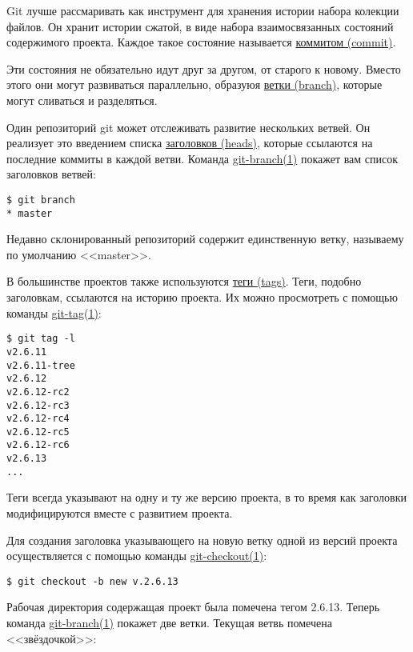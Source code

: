 \documentclass[a4paper, 11pt]{report}
\begin{document}
Git лучше рассмаривать как инструмент для хранения истории набора колекции файлов.
Он хранит истории сжатой, в виде набора взаимосвязанных состояний содержимого
проекта. Каждое такое состояние называется \href{#def_commit}{коммитом (commit)}.

Эти состояния не обязательно идут друг за другом, от старого к новому. Вместо этого
они могут развиваться параллельно, образуюя \href{#def_branch}{ветки (branch)},
которые могут сливаться и разделяться.

Один репозиторий git может отслеживать развитие нескольких ветвей. Он реализует это
введением списка \href{#def_head}{заголовков (heads)}, которые ссылаются на
последние коммиты в каждой ветви. Команда \href{http://www.kernel.org/pub/software/scm/git/docs/git-branch.html}{git-branch(1)}
покажет вам список заголовков ветвей:

\begin{lstlisting}
$ git branch
* master
\end{lstlisting}

Недавно склонированный репозиторий содержит единственную ветку, называему по умолчанию
<<master>>.

В большинстве проектов также используются \href{#def_tag}{теги (tags)}. Теги, подобно
заголовкам, ссылаются на историю проекта. Их можно просмотреть с помощью команды
\href{http://www.kernel.org/pub/software/scm/git/docs/git-tag.html}{git-tag(1)}:

\begin{lstlisting}
$ git tag -l
v2.6.11
v2.6.11-tree
v2.6.12
v2.6.12-rc2
v2.6.12-rc3
v2.6.12-rc4
v2.6.12-rc5
v2.6.12-rc6
v2.6.13
...
\end{lstlisting}

Теги всегда указывают на одну и ту же версию проекта, в то время как заголовки
модифицируются вместе с развитием проекта.

Для создания заголовка указывающего на новую ветку одной из версий проекта
осуществляется с помощью команды
\href{http://www.kernel.org/pub/software/scm/git/docs/git-checkout.html}{git-checkout(1)}:

\begin{lstlisting}
$ git checkout -b new v.2.6.13
\end{lstlisting}

Рабочая директория содержащая проект была помечена тегом 2.6.13. Теперь команда
\href{http://www.kernel.org/pub/software/scm/git/docs/git-branch.html}{git-branch(1)}
покажет две ветки. Текущая ветвь помечена <<звёздочкой>>:
\end{document}
